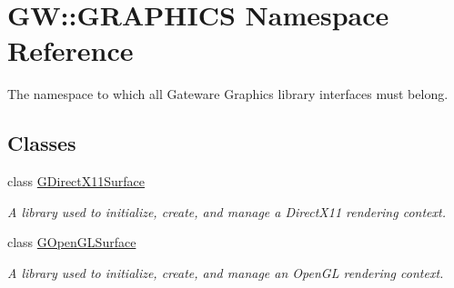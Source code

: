 \hypertarget{namespace_g_w_1_1_g_r_a_p_h_i_c_s}{}\section{GW\+:\+:G\+R\+A\+P\+H\+I\+CS Namespace Reference}
\label{namespace_g_w_1_1_g_r_a_p_h_i_c_s}


The namespace to which all Gateware Graphics library interfaces must belong.  


\subsection*{Classes}
\begin{DoxyCompactItemize}
\item 
class \mbox{\hyperlink{class_g_w_1_1_g_r_a_p_h_i_c_s_1_1_g_direct_x11_surface}{G\+Direct\+X11\+Surface}}
\begin{DoxyCompactList}\small\item\em A library used to initialize, create, and manage a Direct\+X11 rendering context. \end{DoxyCompactList}\item 
class \mbox{\hyperlink{class_g_w_1_1_g_r_a_p_h_i_c_s_1_1_g_open_g_l_surface}{G\+Open\+G\+L\+Surface}}
\begin{DoxyCompactList}\small\item\em A library used to initialize, create, and manage an Open\+GL rendering context. \end{DoxyCompactList}\end{DoxyCompactItemize}
